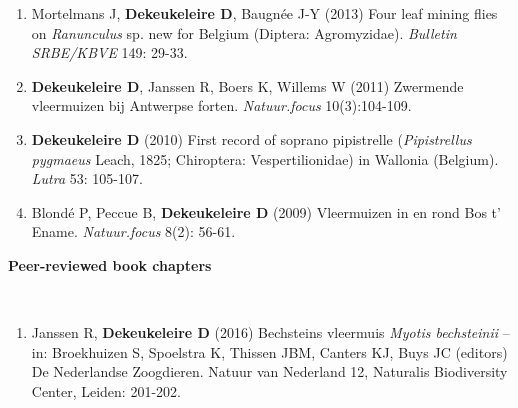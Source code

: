 \documentclass[10pt, twoside]{book} %
\newlength{\thumbheight}
\newlength{\thumbwidth}
\begin{document}
\begin{enumerate}
	\item Mortelmans J, \textbf{Dekeukeleire D}, Baugn\'{e}e J-Y (2013) Four leaf mining flies on \textit{Ranunculus }sp. new for Belgium (Diptera: Agromyzidae). \textit{Bulletin SRBE/KBVE} 149: 29-33.
	
	\item \textbf{Dekeukeleire D}, Janssen R, Boers K, Willems W (2011) Zwermende vleermuizen bij Antwerpse forten. \textit{Natuur.focus} 10(3):104-109.
	
	\item \textbf{Dekeukeleire D} (2010) First record of soprano pipistrelle (\textit{Pipistrellus pygmaeus} Leach, 1825; Chiroptera: Vespertilionidae) in Wallonia (Belgium). \textit{Lutra} 53: 105-107.
	
	\item Blond\'{e} P, Peccue B, \textbf{Dekeukeleire D} (2009) Vleermuizen in en rond Bos t' Ename. \textit{Natuur.focus} 8(2): 56-61.

\vspace*{2cm}	
\end{enumerate}

\begin{large}\textbf{Peer-reviewed book chapters}\end{large}\\

\begin{enumerate}
	\item Janssen R, \textbf{Dekeukeleire D} (2016) Bechsteins vleermuis \textit{Myotis bechsteinii} -- in: Broekhuizen S, Spoelstra K, Thissen JBM, Canters KJ, Buys JC (editors) De Nederlandse Zoogdieren. Natuur van Nederland 12, Naturalis Biodiversity Center, Leiden: 201-202.
\end{enumerate}



\setlength{\thumbwidth}{0cm}
\setlength{\thumbheight}{0cm}
	\begin{footnotesize}
		
	\end{footnotesize}

	
\end{document}
